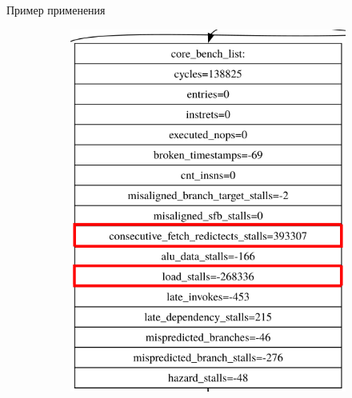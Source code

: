 \documentclass[10pt,aspectratio=169,hyperref={pdftex,unicode},xcolor=dvipsnames]{beamer}
\begin{document}
\begin{frame}{ Пример применения }
\begin{figure}
\begin{subfigure}{0.45\textwidth}
{                \includegraphics[height=0.7\textheight,keepaspectratio]{./images/stac_diff_zoom.png}
            }
        \end{subfigure}
    \end{figure}

\end{frame}
\end{document}
